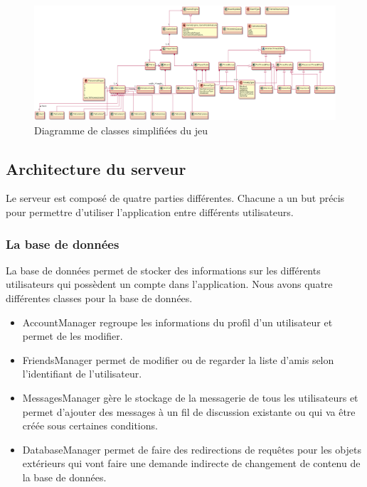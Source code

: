 \documentclass{article}
\begin{document}
\begin{figure}[H]
    \centering
    \includegraphics[scale=0.3, angle=90]{../res/uml/class/GameStructureClass.png}
    \caption{Diagramme de classes simplifiées du jeu}
    \label{fig:WholeGameDiagramm}
\end{figure}

\newpage


\subsection{Architecture du serveur}

Le serveur est composé de quatre parties différentes. Chacune a un but précis pour permettre d'utiliser l'application entre différents utilisateurs.

\subsubsection{La base de données}

La base de données permet de stocker des informations sur les différents utilisateurs qui possèdent un compte dans l'application. Nous avons quatre différentes classes pour la base de données. 
\begin{itemize}
	\item AccountManager regroupe les informations du profil d'un utilisateur et permet de les modifier.
	\item FriendsManager permet de modifier ou de regarder la liste d'amis selon l'identifiant de l'utilisateur.
	\item MessagesManager gère le stockage de la messagerie de tous les utilisateurs et permet d'ajouter des messages à un fil de discussion existante ou qui va être créée sous certaines conditions. 
	\item DatabaseManager permet de faire des redirections de requêtes pour les objets extérieurs qui vont faire une demande indirecte de changement de contenu de la base de données.
\end{itemize}
\end{document}
